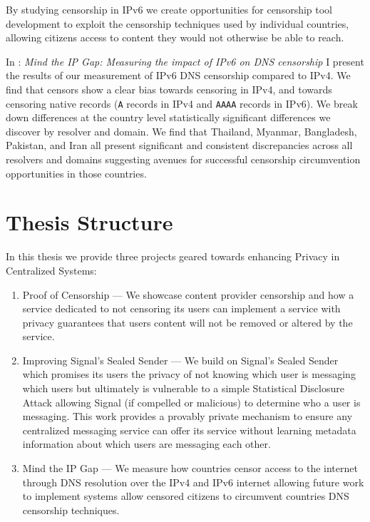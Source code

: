 By studying censorship in IPv6 we create opportunities for censorship tool
development to exploit the censorship techniques used by individual countries,
allowing citizens access to content they would not otherwise be able to reach.

In : \emph{Mind the IP Gap: Measuring the impact of IPv6 on DNS
censorship} I present the results of our measurement of IPv6 DNS censorship
compared to IPv4. We find that censors show a clear bias towards censoring in
IPv4, and towards censoring native records (\texttt{A} records in IPv4 and
\texttt{AAAA} records in IPv6). We break down differences at the country level
statistically significant differences we discover by resolver and domain. We
find that Thailand, Myanmar, Bangladesh, Pakistan, and Iran all present
significant and consistent discrepancies across all resolvers and domains
suggesting avenues for successful censorship circumvention opportunities in
those countries.

\section{Thesis Structure}
In this thesis we provide three projects geared towards enhancing Privacy in
Centralized Systems:

\begin{enumerate}
    \item Proof of Censorship --- We showcase content provider censorship and
    how a service dedicated to not censoring its users can implement a service
    with privacy guarantees that users content will not be removed or altered by
    the service.
    \item Improving Signal's Sealed Sender --- We build on Signal's Sealed
    Sender which promises its users the privacy of not knowing which user is
    messaging which users but ultimately is vulnerable to a simple Statistical
    Disclosure Attack allowing Signal (if compelled or malicious) to determine
    who a user is messaging. This work provides a provably private mechanism to
    ensure any centralized messaging service can offer its service without
    learning metadata information about which users are messaging each other.
    \item Mind the IP Gap --- We measure how countries censor access to the
    internet through DNS resolution over the IPv4 and IPv6 internet allowing
    future work to implement systems allow censored citizens to circumvent
    countries DNS censorship techniques.
\end{enumerate}